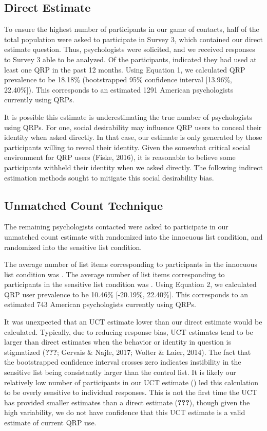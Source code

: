 \documentclass[man]{apa6}
\theoremstyle{definition}
\theoremstyle{definition}
\theoremstyle{definition}
\theoremstyle{remark}
\begin{document}
\subsection{Direct Estimate}\label{direct-estimate-1}

To ensure the highest number of participants in our game of contacts,
half of the total population were asked to participate in Survey 3,
which contained our direct estimate question. Thus, psychologists were
solicited, and we received responses to Survey 3 able to be analyzed. Of
the participants, indicated they had used at least one QRP in the past
12 months. Using Equation 1, we calculated QRP prevalence to be 18.18\%
(bootstrapped 95\% confidence interval {[}13.96\%, 22.40\%{]}). This
corresponds to an estimated 1291 American psychologists currently using
QRPs.

It is possible this estimate is underestimating the true number of
psychologists using QRPs. For one, social desirability may influence QRP
users to conceal their identity when asked directly. In that case, our
estimate is only generated by those participants willing to reveal their
identity. Given the somewhat critical social environment for QRP users
(Fiske, 2016), it is reasonable to believe some participants withheld
their identity when we asked directly. The following indirect estimation
methods sought to mitigate this social desirability bias.

\subsection{Unmatched Count
Technique}\label{unmatched-count-technique-1}

The remaining psychologists contacted were asked to participate in our
unmatched count estimate with randomized into the innocuous list
condition, and randomized into the sensitive list condition.

The average number of list items corresponding to participants in the
innocuous list condition was . The average number of list items
corresponding to participants in the sensitive list condition was .
Using Equation 2, we calculated QRP user prevalence to be 10.46\%
{[}-20.19\%, 22.40\%{]}. This corresponds to an estimated 743 American
psychologists currently using QRPs.

It was unexpected that an UCT estimate lower than our direct estimate
would be calculated. Typically, due to reducing response bias, UCT
estimates tend to be larger than direct estimates when the behavior or
identity in question is stigmatized ({\textbf{???}}; Gervais \& Najle,
2017; Wolter \& Laier, 2014). The fact that the bootstrapped confidence
interval crosses zero indicates instibility in the sensitive list being
consistantly larger than the control list. It is likely our relatively
low number of participants in our UCT estimate () led this calculation
to be overly sensitive to individual responses. This is not the first
time the UCT has provided smaller estimates than a direct estimate
({\textbf{???}}), though given the high variability, we do not have
confidence that this UCT estimate is a valid estimate of current QRP
use.
\end{document}
